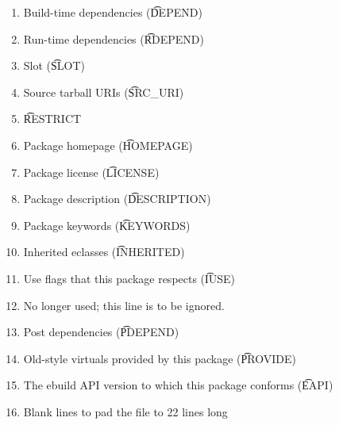 \begin{enumerate}
\item Build-time dependencies (\t{DEPEND})
\item Run-time dependencies (\t{RDEPEND})
\item Slot (\t{SLOT})
\item Source tarball URIs (\t{SRC\_URI})
\item \t{RESTRICT}
\item Package homepage (\t{HOMEPAGE})
\item Package license (\t{LICENSE})
\item Package description (\t{DESCRIPTION})
\item Package keywords (\t{KEYWORDS})
\item Inherited eclasses (\t{INHERITED})
\item Use flags that this package respects (\t{IUSE})
\item No longer used; this line is to be ignored.
\item Post dependencies (\t{PDEPEND})
\item Old-style virtuals provided by this package (\t{PROVIDE})
\item The ebuild API version to which this package conforms (\t{EAPI})
\item Blank lines to pad the file to 22 lines long
\end{enumerate}

